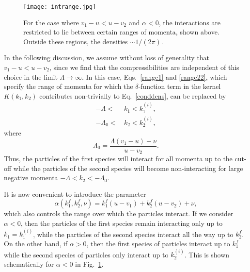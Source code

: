 \documentclass[aps,pra,
superscriptaddress,
reprint,twocolumn,preprintnumbers,
amsmath,amssymb,
nofootinbib]{revtex4-1}
\begin{document}
	\begin{figure}[t]
    \texttt{[image: intrange.jpg]}
    \centering
    \caption{For the case where $v_1 - u < u - v_2$ and $\alpha<$0, the interactions are restricted to lie between certain ranges of momenta, shown above. Outside these regions, the densities $\sim 1/(2\pi)$.}
    \label{fig:04} 
    \end{figure}
		      
In the following discussion, we assume without loss of generality that $v_1 - u < u - v_2$, since we find that the compressibilities are independent of this choice in the limit $\Lambda \to \infty$. In this case, Eqs.~\eqref{range1} and \eqref{range22}, which specify the range of momenta for which the $\delta$-function term in the kernel $K(k_1,k_2)$ contributes non-trivially to Eq.~\eqref{conddens}, can be replaced by 
		\begin{align}
		\label{range2}
		-\Lambda <&\,k_1 < k_1^{(i)}, \nonumber \\
		-\Lambda_0<&\,k_2 < k_2^{(i)},
		\end{align}			
where 
		\begin{equation}
		\Lambda_0 = \frac{\Lambda ( v_1-u) + \nu}{u - v_2}.
		\end{equation}
Thus, the particles of the first species will interact for all momenta up to the cut-off while the  particles of the second species will become non-interacting for large negative momenta $-\Lambda <k_2 < -\Lambda_0$.

It is now convenient to  introduce the parameter 
		\begin{equation}
		\label{alphacond}
		\alpha(k_1^f,k_2^f,\nu) = k_1^f (u - v_1) + k_2^f(u - v_2) + \nu, 
		\end{equation}
which also controls the range over which the particles interact. If we consider $\alpha<0$, then the  particles of the first species remain interacting only up to $k_1 = k_1^{(i)}$, while the particles of the second species interact all the way up to $k_2^f$. On the other hand, if $\alpha > 0$, then the first species of particles interact up to $k_1^f$ while the second species of particles only interact up to $k_2^{(i)}$. This is shown schematically for $\alpha < 0$ in Fig.~\ref{fig:04}.
    
\end{document}
